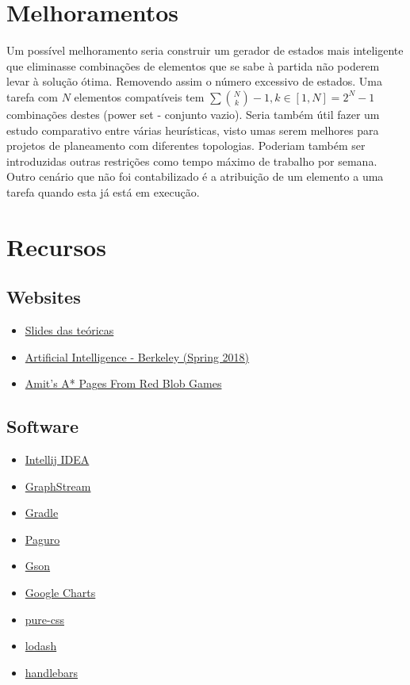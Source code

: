 \documentclass[a4paper,11pt]{article}
\begin{document}
\section{Melhoramentos}

Um possível melhoramento seria construir um gerador de estados mais inteligente que eliminasse combinações de elementos que se sabe à partida não poderem levar à solução ótima. Removendo assim o número excessivo de estados. Uma tarefa com $N$ elementos compatíveis tem $\sum {N \choose k} - 1, k \in [1, N] = 2^N - 1$ combinações destes (power set - conjunto vazio). Seria também útil fazer um estudo comparativo entre várias heurísticas, visto umas serem melhores para projetos de planeamento com diferentes topologias. Poderiam também ser introduzidas outras restrições como tempo máximo de trabalho por semana. Outro cenário que não foi contabilizado é a atribuição de um elemento a uma tarefa quando esta já está em execução.

\section{Recursos}
\subsection{Websites}
\begin{itemize}
	\item \href{https://paginas.fe.up.pt/~eol/IA/1718/ia_.html}{Slides das teóricas}
	\item \href{https://edge.edx.org/courses/course-v1:BerkeleyX+CS188+2018_SP/20021a0a32d14a31b087db8d4bb582fd/}{Artificial Intelligence - Berkeley (Spring 2018)}
	\item \href{http://theory.stanford.edu/~amitp/GameProgramming/}{Amit’s A* Pages From Red Blob Games}
\end{itemize}
\subsection{Software}
\begin{itemize}
	\item \href{https://www.jetbrains.com/idea/}{Intellij IDEA}
	\item \href{http://graphstream-project.org/}{GraphStream}
	\item \href{https://gradle.org/}{Gradle}
	\item \href{https://github.com/GlenKPeterson/Paguro}{Paguro}
	\item \href{https://github.com/google/gson}{Gson}
	\item \href{https://developers.google.com/chart/}{Google Charts}
	\item \href{https://github.com/pure-css/pure}{pure-css}
	\item \href{https://github.com/lodash/lodash}{lodash}
	\item \href{https://github.com/wycats/handlebars.js/}{handlebars}
\end{itemize}

\clearpage
\appendix

\end{document}
